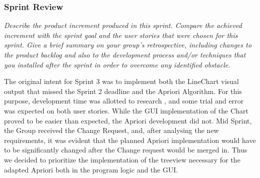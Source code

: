 \subsubsection*{Sprint Review}
\emph{Describe the product increment produced in this sprint. Compare the achieved increment with the sprint goal and the user stories that were chosen for this sprint. Give a brief summary on your group's retrospective, including changes to the product backlog and also to the development process and/or techniques that you installed after the sprint in order to overcome any identified obstacle.}

The original intent for Sprint 3 was to implement both the LineChart visual output that missed the Sprint 2 deadline and the Apriori Algorithm. For this purpose, development time was allotted to research , and some trial and error was expected on both user stories. 
While the GUI implementation of the Chart proved to be easier than expected, the Apriori development did not. Mid Sprint, the Group received the Change Request, and, after analysing the new requirements, it was evident that the planned Apriori implementation would have to be significantly changed after the Change request would be merged in. 
Thus we decided to prioritize the implementation of the treeview necessary for the adapted Apriori both in the program logic and the GUI. 
